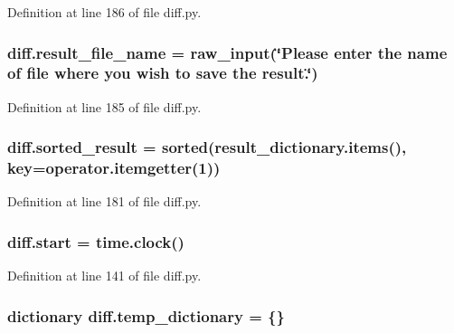 Definition at line 186 of file diff.\+py.

\subsubsection[{\texorpdfstring{result\+\_\+file\+\_\+name}{result_file_name}}]{\setlength{\rightskip}{0pt plus 5cm}diff.\+result\+\_\+file\+\_\+name = raw\+\_\+input(\char`\"{}Please enter the name of {\bf file} where you wish to save the result.\char`\"{})}\hypertarget{namespacediff_a15a863df81a6f3099b088f9f52808389}{}\label{namespacediff_a15a863df81a6f3099b088f9f52808389}


Definition at line 185 of file diff.\+py.

\subsubsection[{\texorpdfstring{sorted\+\_\+result}{sorted_result}}]{\setlength{\rightskip}{0pt plus 5cm}diff.\+sorted\+\_\+result = sorted(result\+\_\+dictionary.\+items(), key=operator.\+itemgetter(1))}\hypertarget{namespacediff_a3b4c2771da02846b61219801d8016b40}{}\label{namespacediff_a3b4c2771da02846b61219801d8016b40}


Definition at line 181 of file diff.\+py.

\subsubsection[{\texorpdfstring{start}{start}}]{\setlength{\rightskip}{0pt plus 5cm}diff.\+start = time.\+clock()}\hypertarget{namespacediff_ac1dbbabcf481dbdd8253f435c6841b59}{}\label{namespacediff_ac1dbbabcf481dbdd8253f435c6841b59}


Definition at line 141 of file diff.\+py.

\subsubsection[{\texorpdfstring{temp\+\_\+dictionary}{temp_dictionary}}]{\setlength{\rightskip}{0pt plus 5cm}dictionary diff.\+temp\+\_\+dictionary = \{\}}\hypertarget{namespacediff_aca04823d91158ba2b053d46e3550516d}{}\label{namespacediff_aca04823d91158ba2b053d46e3550516d}



